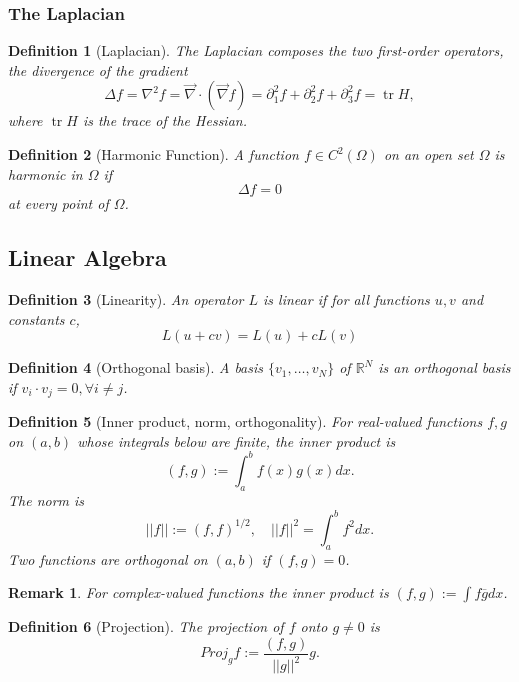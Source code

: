 \documentclass{article}
\newtheorem{definition}{Definition}
\newtheorem{remark}{Remark}
\newcommand{\R}{\mathbb{R}}
\begin{document}
\subsubsection{The Laplacian}
\begin{definition}[Laplacian]
    The Laplacian composes the two first-order operators, the divergence of the gradient
    \begin{equation}
        \label{eq:laplacian}
        \Delta f = \nabla^2 f = \vec{\nabla}\cdot(\vec{\nabla} f) = \partial_1^2 f + \partial_2^2 f + \partial_3^2 f = \operatorname{tr} H,
    \end{equation}
    where $\operatorname{tr} H$ is the trace of the Hessian.
\end{definition}
\begin{definition}[Harmonic Function]
    A function $f\in C^2(\Omega)$ on an open set $\Omega$ is harmonic in $\Omega$ if
    \begin{equation}
        \label{eq:harmonic}
        \Delta f = 0
    \end{equation}
    at every point of $\Omega$.
\end{definition}

\subsection{Linear Algebra}
\begin{definition}[Linearity]
    \label{def:linearity}
    An operator $L$ is \emph{linear} if for all functions $u, v$ and constants $c$,
    \[L(u+cv) = L(u)+cL(v)\]
\end{definition}
\begin{definition}[Orthogonal basis]
    A basis $\{v_1,\dots,v_N\}$ of $\R^N$ is an orthogonal basis if $v_i\cdot v_j = 0, \forall i\neq j$.
\end{definition}
\begin{definition}[Inner product, norm, orthogonality]
    For real-valued functions $f,g$ on $(a,b)$ whose integrals below are finite, the inner product is 
    \[(f,g) := \int_a^b f(x)g(x)dx.\]
    The norm is 
    \[||f|| := (f,f)^{1/2},\quad ||f||^2=\int_a^b f^2 dx.\]
    Two functions are orthogonal on $(a,b)$ if $(f,g) = 0$.
\end{definition}
\begin{remark}
    For complex-valued functions the inner product is $(f,g) := \int f\overline{g}dx$.
\end{remark}
\begin{definition}[Projection]
    The projection of $f$ onto $g\neq 0$ is
    \[Proj_gf := \frac{(f,g)}{||g||^2}g.\]
\end{definition}
\end{document}
